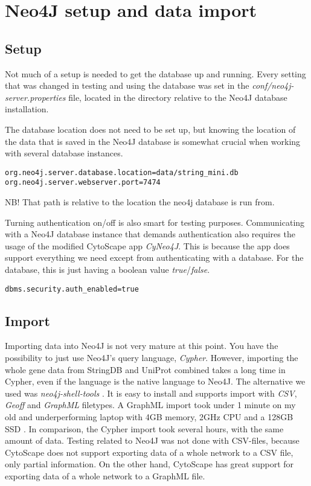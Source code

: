 \section{Neo4J setup and data import}

\subsection{Setup}
Not much of a setup is needed to get the database up and running. Every setting
that was changed in testing and using the database was set in the
\textit{conf/neo4j-server.properties} file, located in the directory relative to
the Neo4J database installation.

The database
location does not need to be set up, but knowing the location of the data that
is saved in the Neo4J database is somewhat crucial when working with several
database instances.

\begin{verbatim}
org.neo4j.server.database.location=data/string_mini.db
org.neo4j.server.webserver.port=7474
\end{verbatim}

NB! That path is relative to the location the neo4j database is run from.

Turning authentication on/off is also smart for testing purposes. Communicating
with a Neo4J database instance that demands authentication also requires the
usage of the modified CytoScape app \textit{CyNeo4J}. This is because the app
does support everything we need except from authenticating with a database. For
the database, this is just having a boolean value \textit{true}/\textit{false}.

\begin{verbatim}
dbms.security.auth_enabled=true
\end{verbatim}

\subsection{Import}
Importing data into Neo4J is not very mature at this point. You have the
possibility to just use Neo4J's query language, \textit{Cypher}. However,
importing the whole gene data from StringDB and UniProt combined takes a long
time in Cypher, even if the language is the native language to Neo4J. The
alternative we used was \textit{neo4j-shell-tools} \cite{neo4j-tools}. It is
easy to install and supports import with \textit{CSV}, \textit{Geoff} and
\textit{GraphML} filetypes. A GraphML import took under 1 minute on my old and
underperforming laptop with 4GB memory, 2GHz CPU and a 128GB SSD \cite{laptop}.
In comparison, the Cypher import took several hours, with the same amount of
data. Testing related to Neo4J was not done with CSV-files, because CytoScape
does not support exporting data of a whole network to a CSV file, only partial
information. On the other hand, CytoScape has great support for exporting data
of a whole network to a GraphML file.

